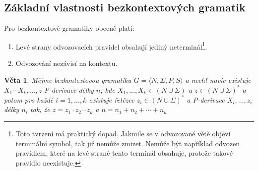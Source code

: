 \documentclass[10pt, a4paper, titlepage]{article}
\theoremstyle{note}
\newtheorem{veta}{Věta}
\begin{document}
\subsection{Základní vlastnosti bezkontextových gramatik}

Pro bezkontextové gramatiky obecně platí:
\begin{enumerate}		%
\item
Levé strany odvozovacích pravidel obsahují jediný neterminál\footnote{Toto tvrzení má praktický dopad. Jakmile se v odvozované větě objeví
terminální symbol, tak již nemůže zmizet. Nemůže být například odvozen pravidlem, které na levé straně tento termínál obsahuje, protože takové pravidlo neexistuje.}.

\item
Odvozování nezávisí na kontextu.
\end{enumerate}

\begin{veta}\label{veta-bez}
Mějme bezkontextovou gramatiku  $G = \langle N, \Sigma, P, S \rangle$ a nechť navíc existuje $X_{1} \cdots X_{k}, \ldots, z$
P-derivace délky $n$, kde $X_{1}, \ldots, X_{k} \in (N \cup \Sigma)$ a $z \in (N \cup \Sigma)^{*}$ 
a potom pro každé $i = 1, \ldots, k$  existuje řetězec $z_{i} \in (N \cup \Sigma)^{*}$ 
a P-derivace $X_{i}, \ldots, z_{i}$ délky $n_{i}$ tak, že $z = z_{1} \cdot z_{2} \cdots z_{k}$ a $n = n_{1} + n_{2} + \cdots + n_{k}$
\end{veta}
\end{document}
